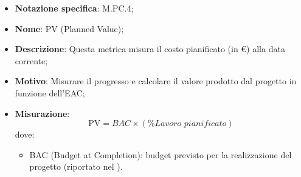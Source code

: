 \begin{itemize}
    \item \textbf{Notazione specifica}: M.PC.4;
    \item \textbf{Nome}: PV (Planned Value);
    \item \textbf{Descrizione}: Questa metrica misura il costo pianificato (in €) alla data corrente;
    \item \textbf{Motivo}: Misurare il progresso e calcolare il valore prodotto dal progetto in funzione dell'EAC;
    \item \textbf{Misurazione}:
    \[
        \text{PV} = \textit{BAC} \times (\% {\textit{Lavoro pianificato}})
    \]
    dove:
    \begin{itemize}
        \item BAC (Budget at Completion): budget previsto per la realizzazione del progetto (riportato nel \VersionePP).
    \end{itemize}
\end{itemize}
